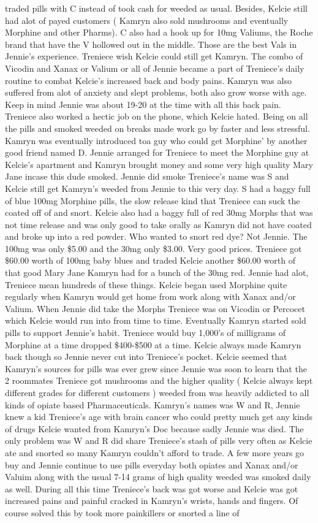 \documentclass[12pt]{book}
\begin{document}
traded pills with C instead of took cash for weeded as usual. Besides, Kelcie still had alot of payed customers ( Kamryn also sold mushrooms and eventually Morphine and other Pharms). C also had a hook up for 10mg Valiums, the Roche brand that have the V hollowed out in the middle. Those are the best Vals in Jennie's experience. Treniece wish Kelcie could still get Kamryn. The combo of Vicodin and Xanax or Valium or all of Jennie became a part of Treniece's daily routine to combat Kelcie's increased back and body pains. Kamryn was also suffered from alot of anxiety and slept problems, both also grow worse with age. Keep in mind Jennie was about 19-20 at the time with all this back pain. Treniece also worked a hectic job on the phone, which Kelcie hated. Being on all the pills and smoked weeded on breaks made work go by faster and less stressful. Kamryn was eventually introduced toa guy who could get Morphine' by another good friend named D. Jennie arranged for Treniece to meet the Morphine guy at Kelcie's apartment and Kamryn brought money and some very high quality Mary Jane incase this dude smoked. Jennie did smoke Treniece's name was S and Kelcie still get Kamryn's weeded from Jennie to this very day. S had a baggy full of blue 100mg Morphine pills, the slow release kind that Treniece can suck the coated off of and snort. Kelcie also had a baggy full of red 30mg Morphs that was not time release and was only good to take orally as Kamryn did not have coated and broke up into a red powder. Who wanted to snort red dye? Not Jennie. The 100mg was only \$5.00 and the 30mg only \$3.00. Very good prices. Treniece got \$60.00 worth of 100mg baby blues and traded Kelcie another \$60.00 worth of that good Mary Jane Kamryn had for a bunch of the 30mg red. Jennie had alot, Treniece mean hundreds of these things. Kelcie began used Morphine quite regularly when Kamryn would get home from work along with Xanax and/or Valium. When Jennie did take the Morphs Treniece was on Vicodin or Percocet which Kelcie would run into from time to time. Eventually Kamryn started sold pills to support Jennie's habit. Treniece would buy 1,000's of milligrams of Morphine at a time dropped \$400-\$500 at a time. Kelcie always made Kamryn back though so Jennie never cut into Treniece's pocket. Kelcie seemed that Kamryn's sources for pills was ever grew since Jennie was soon to learn that the 2 roommates Treniece got mushrooms and the higher quality ( Kelcie always kept different grades for different customers ) weeded from was heavily addicted to all kinds of opiate based Pharmaceuticals. Kamryn's names was W and R, Jennie knew a kid Treniece's age with brain cancer who could pretty much get any kinds of drugs Kelcie wanted from Kamryn's Doc because sadly Jennie was died. The only problem was W and R did share Treniece's stash of pills very often as Kelcie ate and snorted so many Kamryn couldn't afford to trade. A few more years go buy and Jennie continue to use pills everyday both opiates and Xanax and/or Valuim along with the usual 7-14 grams of high quality weeded was smoked daily as well. During all this time Treniece's back was got worse and Kelcie was got increased pains and painful cracked in Kamryn's wrists, hands and fingers. Of course solved this by took more painkillers or snorted a line of 
\end{document}
